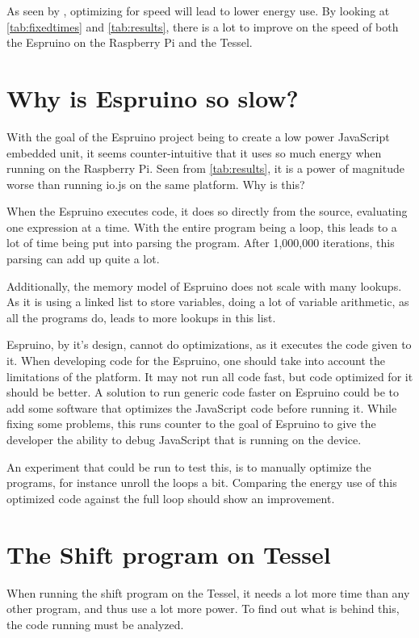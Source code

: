 As seen by \citet{valluri01}, optimizing for speed will lead to lower energy use.
By looking at \cref{tab:fixedtimes} and \cref{tab:results}, there is a lot to improve on the speed of both the Espruino on the Raspberry Pi and the Tessel.

\section{Why is Espruino so slow?}
With the goal of the Espruino project being to create a low power JavaScript embedded unit, it seems counter-intuitive that it uses so much energy when running on the Raspberry Pi.
Seen from \cref{tab:results}, it is a power of magnitude worse than running io.js on the same platform.
Why is this?

When the Espruino executes code, it does so directly from the source, evaluating one expression at a time.
With the entire program being a loop, this leads to a lot of time being put into parsing the program.
After 1,000,000 iterations, this parsing can add up quite a lot.

Additionally, the memory model of Espruino does not scale with many lookups.
As it is using a linked list to store variables, doing a lot of variable arithmetic, as all the programs do, leads to more lookups in this list.

Espruino, by it's design, cannot do optimizations, as it executes the code given to it.
When developing code for the Espruino, one should take into account the limitations of the platform.
It may not run all code fast, but code optimized for it should be better.
A solution to run generic code faster on Espruino could be to add some software that optimizes the JavaScript code before running it.
While fixing some problems, this runs counter to the goal of Espruino to give the developer the ability to debug JavaScript that is running on the device.

An experiment that could be run to test this, is to manually optimize the programs, for instance unroll the loops a bit.
Comparing the energy use of this optimized code against the full loop should show an improvement.

\section{The Shift program on Tessel}
\label{sec:shifttessel}
When running the shift program on the Tessel, it needs a lot more time than any other program, and thus use a lot more power.
To find out what is behind this, the code running must be analyzed.

